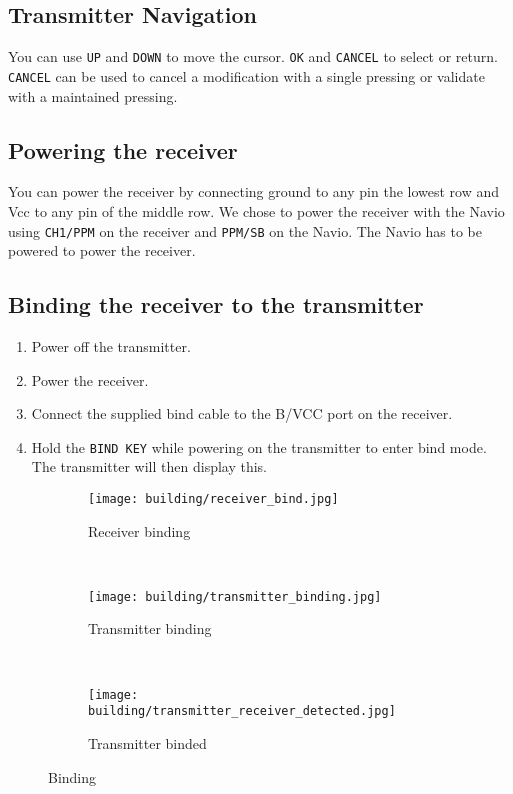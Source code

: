 \subsection{Transmitter Navigation}
You can use \texttt{UP} and \texttt{DOWN} to move the cursor.
\texttt{OK} and \texttt{CANCEL} to select or return.
\texttt{CANCEL} can be used to cancel a modification with a single pressing or validate with a maintained pressing.

\subsection{Powering the receiver}
You can power the receiver by connecting ground to any pin the lowest row and Vcc to any pin of the middle row.
We chose to power the receiver with the Navio using \texttt{CH1/PPM} on the receiver and \texttt{PPM/SB} on the Navio. The Navio has to be powered to power the receiver.

\subsection{Binding the receiver to the transmitter}
\begin{enumerate}
    \item Power off the transmitter.
    \item Power the receiver.
    \item Connect the supplied bind cable to the B/VCC port on the receiver.
    \item Hold the \texttt{BIND KEY} while powering on the transmitter to enter bind mode. The transmitter will then display this.
\end{enumerate}

\begin{figure}[!ht]
    \centering
    \begin{subfigure}[b]{0.3\textwidth}
        \texttt{[image: building/receiver\_bind.jpg]}
        \caption{Receiver binding}
        \label{fig:receiver_bind}
    \end{subfigure}
    ~
    \begin{subfigure}[b]{0.3\textwidth}
        \texttt{[image: building/transmitter\_binding.jpg]}
        \caption{Transmitter binding}
        \label{fig:transmitter_binding}
    \end{subfigure}
    ~
    \begin{subfigure}[b]{0.3\textwidth}
        \texttt{[image: building/transmitter\_receiver\_detected.jpg]}
        \caption{Transmitter binded}
        \label{fig:transmitter_receiver_detected}
    \end{subfigure}
    \caption{Binding}\label{fig:binding}
\end{figure}

